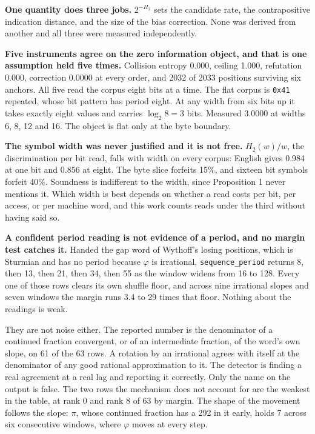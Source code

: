\textbf{One quantity does three jobs.} \(2^{-H_2}\) sets the candidate rate, the contrapositive indication distance, and the size of the bias correction. None was derived from another and all three were measured independently.

\textbf{Five instruments agree on the zero information object, and that is one assumption held five times.} Collision entropy 0.000, ceiling 1.000, refutation 0.000, correction 0.0000 at every order, and 2032 of 2033 positions surviving six anchors. All five read the corpus eight bits at a time. The flat corpus is \texttt{0x41} repeated, whose bit pattern has period eight. At any width from six bits up it takes exactly eight values and carries \(\log_2 8 = 3\) bits. Measured 3.0000 at widths 6, 8, 12 and 16. The object is flat only at the byte boundary.

\textbf{The symbol width was never justified and it is not free.} \(H_2(w)/w\), the discrimination per bit read, falls with width on every corpus: English gives 0.984 at one bit and 0.856 at eight. The byte slice forfeits 15\%, and sixteen bit symbols forfeit 40\%. Soundness is indifferent to the width, since Proposition 1 never mentions it. Which width is best depends on whether a read costs per bit, per access, or per machine word, and this work counts reads under the third without having said so.

\textbf{A confident period reading is not evidence of a period, and no margin test catches it.} Handed the gap word of Wythoff's losing positions, which is Sturmian and has no period because \(\varphi\) is irrational, \texttt{sequence\_period} returns 8, then 13, then 21, then 34, then 55 as the window widens from 16 to 128. Every one of those rows clears its own shuffle floor, and across nine irrational slopes and seven windows the margin runs 3.4 to 29 times that floor. Nothing about the readings is weak.

They are not noise either. The reported number is the denominator of a continued fraction convergent, or of an intermediate fraction, of the word's own slope, on 61 of the 63 rows. A rotation by an irrational agrees with itself at the denominator of any good rational approximation to it. The detector is finding a real agreement at a real lag and reporting it correctly. Only the name on the output is false. The two rows the mechanism does not account for are the weakest in the table, at rank 0 and rank 8 of 63 by margin. The shape of the movement follows the slope: \(\pi\), whose continued fraction has a 292 in it early, holds 7 across six consecutive windows, where \(\varphi\) moves at every step.


